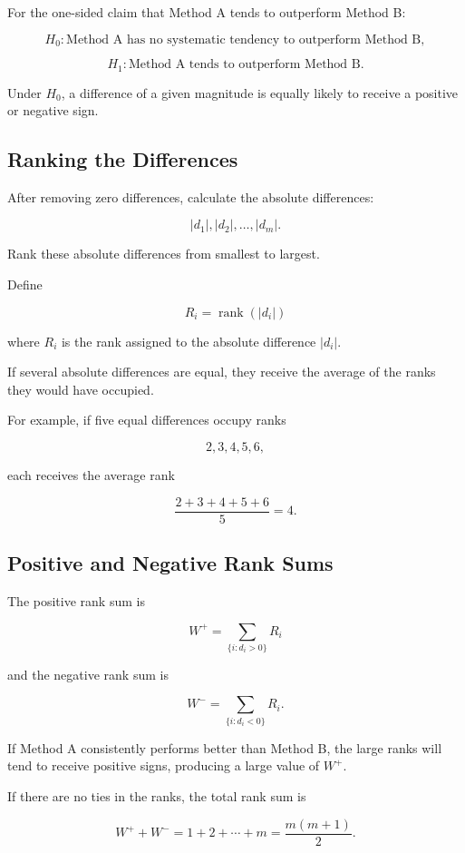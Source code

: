 \documentclass[11pt]{article}
\begin{document}
For the one-sided claim that Method A tends to outperform Method B:

\[
H_0:
\text{Method A has no systematic tendency to outperform Method B},
\]

\[
H_1:
\text{Method A tends to outperform Method B}.
\]

Under \(H_0\), a difference of a given magnitude is equally likely to
receive a positive or negative sign.

\subsection{Ranking the Differences}

After removing zero differences, calculate the absolute differences:

\[
|d_1|,|d_2|,\ldots,|d_m|.
\]

Rank these absolute differences from smallest to largest.

Define

\[
\boxed{
R_i=\operatorname{rank}(|d_i|)
}
\]

where \(R_i\) is the rank assigned to the absolute difference
\(|d_i|\).

If several absolute differences are equal, they receive the average of
the ranks they would have occupied.

For example, if five equal differences occupy ranks

\[
2,3,4,5,6,
\]

each receives the average rank

\[
\frac{2+3+4+5+6}{5}=4.
\]

\subsection{Positive and Negative Rank Sums}

The positive rank sum is

\[
\boxed{
W^+
=
\sum_{\{i:d_i>0\}}R_i
}
\]

and the negative rank sum is

\[
\boxed{
W^-
=
\sum_{\{i:d_i<0\}}R_i.
}
\]

If Method A consistently performs better than Method B, the large ranks
will tend to receive positive signs, producing a large value of \(W^+\).

If there are no ties in the ranks, the total rank sum is

\[
W^++W^-
=
1+2+\cdots+m
=
\frac{m(m+1)}{2}.
\]
\end{document}
